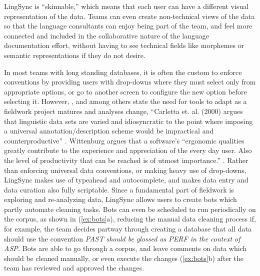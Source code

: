 \documentclass[letterpaper, 12pt, dvips]{mitwpl}
\begin{document}
LingSync is ``skinnable,''
which means that each user can have a different visual representation of the data.
Teams can even create non-technical views of the data so that the language consultants can enjoy being part of the team, and feel more connected and included in  the collaborative nature of the language documentation effort, without having to see technical fields like morphemes or semantic representations if they do not desire.


In most teams with long standing databases,
it is often the custom to enforce conventions by providing users with drop-downs where they must select only from appropriate options,
or go to another screen to configure the new option before selecting it.
However, \cite{Palmer:2009}, \cite{Cihlar:2008}  and \cite{Wittenburg:2006} among others state the need for tools to adapt as a fieldwork project matures and analyses change, 
``Carletta et. al. (2000) argues that linguistic data sets are varied and idiosyncratic to the point where imposing a universal annotation/description scheme would be impractical and counterproductive''   \cite[p.11]{Cihlar:2008}. Wittenburg argues that a software's ``ergonomic qualities greatly contribute to the experience and appreciation of the every day user. Also the level of productivity that can be reached is of utmost importance.'' \citep[p.1559]{Wittenburg:2006}.
Rather than enforcing universal data conventions,
or making heavy use of drop-downs, 
LingSync makes use of  typeahead and autocomplete, 
and makes data entry and data curation also fully scriptable.
Since a fundamental part of fieldwork is exploring and re-analyzing data,
LingSync allows users to create bots which partly automate cleaning tasks.
Bots can even be scheduled to run periodically on the corpus, as shown in (\ref{ex:bots}a),
reducing the manual data cleaning process if,
for example,
the team decides partway through creating a database that all data should use the convention \emph{PAST should be glossed as PERF in the context of ASP.} Bots are able to go through a corpus,
and leave comments on data which should be cleaned manually,
or even execute the changes (\ref{ex:bots}b) after the team has reviewed and approved the changes.


\end{document}
